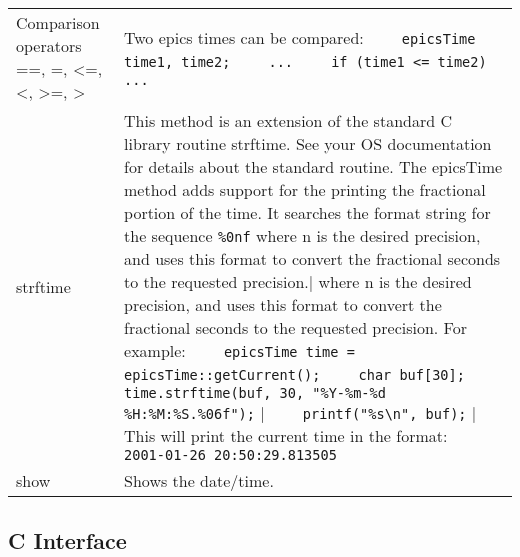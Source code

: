 \begin{center}
\begin{longtable}{p{2in}p{4.75in}}
Comparison operators ==, \textbar{}=, \textless{}=, \textless{}, \textgreater{}=, \textgreater{} &
Two epics times can be compared:\newline
\verb|    epicsTime time1, time2;| \newline
\verb|    ...| \newline
\verb|    if (time1 <= time2)| \newline
\verb|        ...| \\

strftime &
This method is an extension of the standard C library routine strftime.
See your OS documentation for details about the standard routine.
The epicsTime method adds support for the printing the fractional portion of the time.
It searches the format string for the sequence \verb|%0nf| where n is the desired precision, and uses this format to convert the fractional seconds to the requested precision.
For example: \newline
\verb|    epicsTime time = epicsTime::getCurrent();| \newline
\verb|    char buf[30];| \newline
\verb|    time.strftime(buf, 30, "%Y-%m-%d %H:%M:%S.%06f");| \newline
\verb|    printf("%s\n", buf);| \newline
This will print the current time in the format: \newline
\verb|    2001-01-26 20:50:29.813505| \\

show &
Shows the date/time.
\end{longtable}

\end{center}


\subsection{C Interface}

